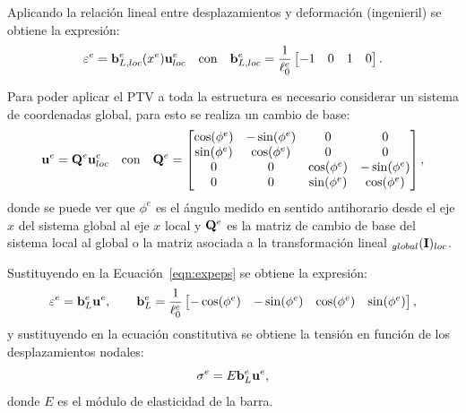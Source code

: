 Aplicando la relación lineal entre desplazamientos y deformación (ingenieril) se obtiene la expresión:
%
\begin{equation}\label{eqn:expeps}
\varepsilon^e =  {\bf b}_{L,loc}^e(x^e) {\bf u}_{loc}^e
\quad
\text{con}
\quad
{\bf b}_{L,loc}^e = \frac{1}{\ell_0^e} \left[ \begin{matrix}
-1 & 0 & 1 & 0
\end{matrix} \right].
\end{equation}

Para poder aplicar el PTV a toda la estructura es necesario considerar un sistema de coordenadas global, para esto se realiza un cambio de base:
%
\begin{equation}
{\bf u}^e = {\bf Q}^e {\bf u}^e_{loc} \quad \text{con} \quad {\bf Q}^e = \left[
\begin{matrix}
\cos(\phi^e) & -\sin(\phi^e) & 0 & 0 \\
\sin(\phi^e)  & \cos(\phi^e) & 0 & 0 \\
0  & 0 & \cos(\phi^e) &-\sin(\phi^e) \\
0  & 0 & \sin(\phi^e) & \cos(\phi^e) \\
\end{matrix}\right],
\end{equation}
%
donde se puede ver que $\phi^e$ es el ángulo medido en sentido antihorario desde el eje $x$ del sistema global al eje $x$ local y ${\bf Q}^e$ es la matriz de cambio de base del sistema local al global o la matriz asociada a la transformación lineal $_{global}({\bf I})_{loc}$.


Sustituyendo en la Ecuación~\eqref{eqn:expeps} se obtiene la expresión:
%
\begin{equation}\label{eqn:exprepslin}
\varepsilon^e =  {\bf b}_L^e {\bf u}^e,
\qquad
{\bf b}_L^e = \frac{1}{\ell_0^e} \left[ \begin{matrix}
-\cos(\phi^e) & -\sin(\phi^e) & \cos(\phi^e) & \sin(\phi^e)
\end{matrix} \right],
\end{equation}
%
y sustituyendo en la ecuación constitutiva se obtiene la tensión en función de los desplazamientos nodales:
%
\begin{equation}
\sigma^e = E {\bf b}_L^e {\bf u}^e,
\end{equation}
donde $E$ es el módulo de elasticidad de la barra. %
%

